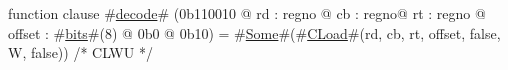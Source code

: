 function clause #\hyperref[zdecode]{decode}# (0b110010 @ rd : regno @ cb : regno@ rt : regno @ offset : #\hyperref[zbits]{bits}#(8) @ 0b0 @ 0b10) = #\hyperref[zSome]{Some}#(#\hyperref[zCLoad]{CLoad}#(rd, cb, rt, offset, false, W, false)) /* CLWU */
